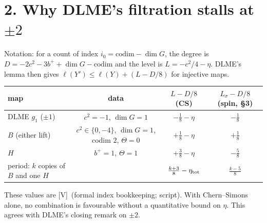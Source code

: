 \documentclass[10pt]{amsart}
\newcommand{\V}{\textsf{[V]}}\newcommand{\Pl}{\textsf{[P]}}\newcommand{\Sp}{\textsf{[S]}}
\begin{document}
\section*{2. Why DLME's filtration stalls at $\pm2$}
Notation: for a count of index $i_0=\mathrm{codim}-\dim G$, the degree is $D=-2c^2-3b^++\dim G-\mathrm{codim}$ and the level is $L=-c^2/4-\eta$. DLME's lemma then gives $\ell(Y')\le\ell(Y)+(L-D/8)$ for injective maps.
\begin{center}\small
\begin{tabular}{@{}lccc@{}}
\toprule
map & data & $L-D/8$ (CS) & $L_\sigma-D/8$ (spin, \S3)\\ \midrule
DLME $g_1$ ($\pm1$) & $c^2=-1$, $\dim G=1$ & $-\tfrac18-\eta$ & $-\tfrac18$\\
$B$ (either lift) & $c^2\in\{0,-4\}$, $\dim G=1$, codim $2$, $\Theta=0$ & $+\tfrac18-\eta$ & $+\tfrac18$\\
$H$ & $b^+=1$, $\Theta=1$ & $+\tfrac38-\eta$ & $-\tfrac58$\\
period: $k$ copies of $B$ and one $H$ & & $\tfrac{k+3}8-\eta_{\rm tot}$ & $\tfrac{k-5}8$\\
\bottomrule
\end{tabular}
\end{center}
These values are \V\ (formal index bookkeeping; script). With Chern--Simons alone, no combination is favourable without a quantitative bound on $\eta$. This agrees with DLME's closing remark on $\pm2$.
\end{document}
